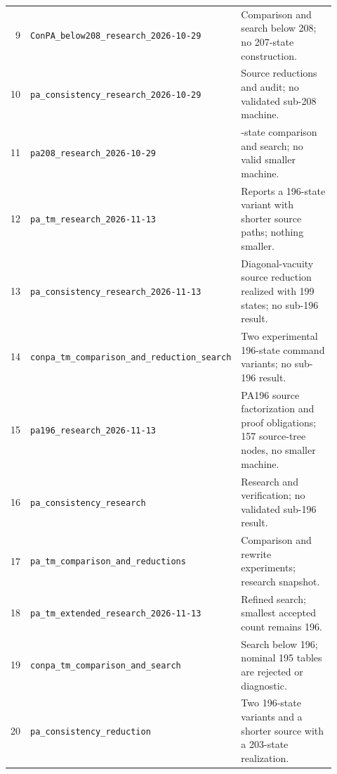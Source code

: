{\begin{longtable}{@{}r >{\raggedright\arraybackslash}p{0.36\linewidth} >{\raggedright\arraybackslash}p{0.56\linewidth}@{}}
9 & \texttt{ConPA\_\allowbreak{}below208\_\allowbreak{}research\_\allowbreak{}2026-\allowbreak{}10-\allowbreak{}29} & Comparison and search below 208; no 207-state construction.\\[3pt]
10 & \texttt{pa\_\allowbreak{}consistency\_\allowbreak{}research\_\allowbreak{}2026-\allowbreak{}10-\allowbreak{}29} & Source reductions and audit; no validated sub-208 machine.\\[3pt]
11 & \texttt{pa208\_\allowbreak{}research\_\allowbreak{}2026-\allowbreak{}10-\allowbreak{}29} & 208-state comparison and search; no valid smaller machine.\\[3pt]
12 & \texttt{pa\_\allowbreak{}tm\_\allowbreak{}research\_\allowbreak{}2026-\allowbreak{}11-\allowbreak{}13} & Reports a 196-state variant with shorter source paths; nothing smaller.\\[3pt]
13 & \texttt{pa\_\allowbreak{}consistency\_\allowbreak{}research\_\allowbreak{}2026-\allowbreak{}11-\allowbreak{}13} & Diagonal-vacuity source reduction realized with 199 states; no sub-196 result.\\[3pt]
14 & \texttt{conpa\_\allowbreak{}tm\_\allowbreak{}comparison\_\allowbreak{}and\_\allowbreak{}reduction\_\allowbreak{}search} & Two experimental 196-state command variants; no sub-196 result.\\[3pt]
15 & \texttt{pa196\_\allowbreak{}research\_\allowbreak{}2026-\allowbreak{}11-\allowbreak{}13} & PA196 source factorization and proof obligations; 157 source-tree nodes, no smaller machine.\\[3pt]
16 & \texttt{pa\_\allowbreak{}consistency\_\allowbreak{}research} & Research and verification; no validated sub-196 result.\\[3pt]
17 & \texttt{pa\_\allowbreak{}tm\_\allowbreak{}comparison\_\allowbreak{}and\_\allowbreak{}reductions} & Comparison and rewrite experiments; research snapshot.\\[3pt]
18 & \texttt{pa\_\allowbreak{}tm\_\allowbreak{}extended\_\allowbreak{}research\_\allowbreak{}2026-\allowbreak{}11-\allowbreak{}13} & Refined search; smallest accepted count remains 196.\\[3pt]
19 & \texttt{conpa\_\allowbreak{}tm\_\allowbreak{}comparison\_\allowbreak{}and\_\allowbreak{}search} & Search below 196; nominal 195 tables are rejected or diagnostic.\\[3pt]
20 & \texttt{pa\_\allowbreak{}consistency\_\allowbreak{}reduction} & Two 196-state variants and a shorter source with a 203-state realization.\\[3pt]

\end{longtable}}
